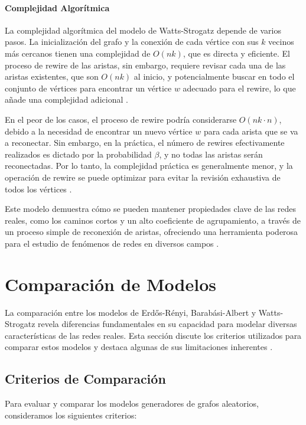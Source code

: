 \paragraph{Complejidad Algorítmica}

La complejidad algorítmica del modelo de Watts-Strogatz depende de varios pasos. La inicialización del grafo y la conexión de cada vértice con sus $k$ vecinos más cercanos tienen una complejidad de $O(nk)$, que es directa y eficiente. El proceso de rewire de las aristas, sin embargo, requiere revisar cada una de las aristas existentes, que son $O(nk)$ al inicio, y potencialmente buscar en todo el conjunto de vértices para encontrar un vértice $w$ adecuado para el rewire, lo que añade una complejidad adicional .

En el peor de los casos, el proceso de rewire podría considerarse $O(nk \cdot n)$, debido a la necesidad de encontrar un nuevo vértice $w$ para cada arista que se va a reconectar. Sin embargo, en la práctica, el número de rewires efectivamente realizados es dictado por la probabilidad $\beta$, y no todas las aristas serán reconectadas. Por lo tanto, la complejidad práctica es generalmente menor, y la operación de rewire se puede optimizar para evitar la revisión exhaustiva de todos los vértices .

Este modelo demuestra cómo se pueden mantener propiedades clave de las redes reales, como los caminos cortos y un alto coeficiente de agrupamiento, a través de un proceso simple de reconexión de aristas, ofreciendo una herramienta poderosa para el estudio de fenómenos de redes en diversos campos .

\section{Comparación de Modelos}
La comparación entre los modelos de Erdős-Rényi, Barabási-Albert y Watts-Strogatz revela diferencias fundamentales en su capacidad para modelar diversas características de las redes reales. Esta sección discute los criterios utilizados para comparar estos modelos y destaca algunas de sus limitaciones inherentes .

\subsection{Criterios de Comparación}
Para evaluar y comparar los modelos generadores de grafos aleatorios, consideramos los siguientes criterios:

